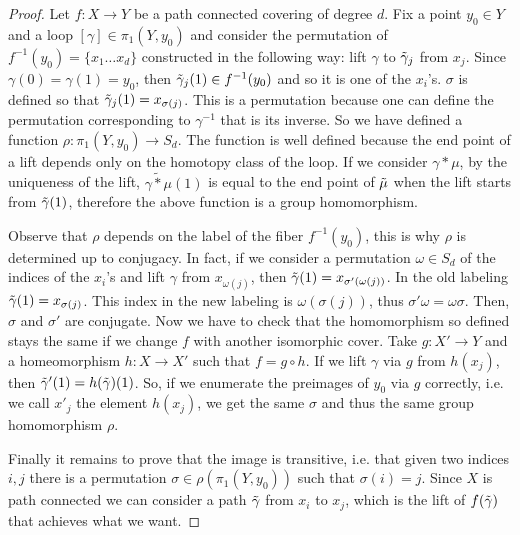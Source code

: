 \documentclass[12pt,a4paper,openright,twoside]{report}
\theoremstyle{definition} %
\begin{document}
\begin{proof}
    Let \(f : X \to Y\) be a path connected covering of degree \(d\). Fix a point \(y_0 \in Y\) and a loop \([\gamma] \in \pi_1(Y,y_0)\) and consider the permutation of \(f^{-1}(y_0) = \{x_1 \ldots x_d\} \) constructed in the following way: lift \(\gamma\) to \(\Tilde{\gamma}_j\) from \(x_j\). Since \(\gamma(0) = \gamma(1) = y_0 \), then \(\Tilde{\gamma}_j(1) \in f^{-1}(y_0)\) and so it is one of the \(x_i\)'s. \(\sigma \) is defined so that \(\Tilde{\gamma}_j(1) = x_{\sigma(j)}\). This is a permutation because one can define the permutation corresponding to \(\gamma^{-1}\) that is its inverse. So we have defined a function \( \rho : \pi_1(Y,y_0) \to S_d\). 
    The function is well defined because the end point of a lift depends only on the homotopy class of the loop.
    If we consider \(\gamma * \mu\), by the uniqueness of the lift, \(\widetilde{\gamma * \mu}(1)\) is equal to the end point of \(\Tilde{\mu}\) when the lift starts from \(\Tilde{\gamma}(1)\), therefore the above function is a group homomorphism.
    
    Observe that \(\rho\) depends on the label of the fiber \(f^{-1}(y_0)\), this is why \(\rho\) is determined up to conjugacy. In fact, if we consider a permutation \(\omega \in S_d\) of the indices of the \(x_i\)'s and lift \(\gamma\) from \(x_{\omega(j)}\), then \(\Tilde{\gamma}(1)=x_{\sigma'(\omega(j))}\). In the old labeling \(\Tilde{\gamma}(1) = x_{\sigma(j)}\). This index in the new labeling is \(\omega(\sigma(j))\), thus \(\sigma' \omega = \omega \sigma\). Then, \(\sigma\) and \(\sigma'\) are conjugate.
    Now we have to check that the homomorphism so defined stays the same if we change \(f\) with another isomorphic cover. Take \(g : X' \to Y\) and a homeomorphism \(h : X \to X'\) such that \( f = g \circ h \). If we lift \(\gamma\) via \(g\) from \(h(x_j)\), then \(\Tilde{\gamma}'(1) = h(\Tilde{\gamma})(1)\). So, if we enumerate the preimages of \(y_0\) via \(g\) correctly, i.e. we call \(x'_j\) the element \(h(x_j)\), we get the same \(\sigma\) and thus the same group homomorphism \(\rho\).

    Finally it remains to prove that the image is transitive, i.e. that given two indices \(i, j\) there is a permutation \(\sigma \in \rho(\pi_1(Y,y_0))\) such that \(\sigma(i) = j\). Since \(X\) is path connected we can consider a path \(\Tilde{\gamma}\) from \(x_i\) to \(x_j\), which is the lift of \(f(\Tilde{\gamma})\) that achieves what we want.


\end{proof}
\end{document}
